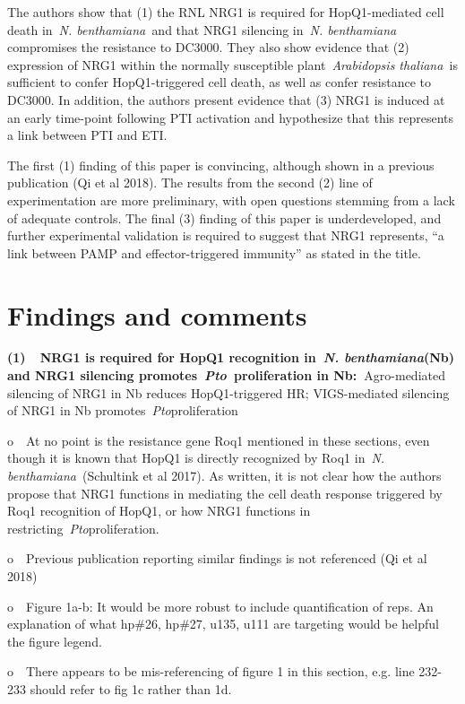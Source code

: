\documentclass[10pt]{article}
\begin{document}
The authors show that (1) the RNL NRG1 is required for HopQ1-mediated
cell death in~\emph{N. benthamiana~}and that NRG1 silencing in~\emph{N.
benthamiana} compromises the resistance to DC3000. They also show
evidence that (2) expression of NRG1 within the normally susceptible
plant~\emph{Arabidopsis thaliana~}is sufficient to confer
HopQ1-triggered cell death, as well as confer resistance to DC3000. In
addition, the authors present evidence that (3) NRG1 is induced at an
early time-point following PTI activation and hypothesize that this
represents a link between PTI and ETI.~

The first (1) finding of this paper is convincing, although shown in a
previous publication (Qi et al 2018). The results from the second (2)
line of experimentation are more preliminary, with open questions
stemming from a lack of adequate controls. The final (3) finding of this
paper is underdeveloped, and further experimental validation is required
to suggest that NRG1 represents, ``a link between PAMP and
effector-triggered immunity'' as stated in the title.~~

\section*{\(\)Findings and
comments}

{\label{457509}}\par\null

\textbf{(1)~~NRG1 is required for HopQ1 recognition in~\emph{N.
benthamiana}(Nb) and NRG1 silencing promotes~\emph{Pto~}proliferation in
Nb:~}Agro-mediated silencing of NRG1 in Nb reduces HopQ1-triggered HR;
VIGS-mediated silencing of NRG1 in Nb promotes~\emph{Pto}proliferation~

o~~At no point is the resistance gene Roq1 mentioned in these sections,
even though it is known that HopQ1 is directly recognized by Roq1
in~\emph{N. benthamiana~}(Schultink et al 2017). As written, it is not
clear how the authors propose that NRG1 functions in mediating the cell
death response triggered by Roq1 recognition of HopQ1, or how NRG1
functions in restricting~\emph{Pto}proliferation.~

o~~Previous publication reporting similar findings is not referenced (Qi
et al 2018)

o~~Figure 1a-b: It would be more robust to include quantification of
reps. An explanation of what hp\#26, hp\#27, u135, u111 are targeting
would be helpful the figure legend.~~

o~~There appears to be mis-referencing of figure 1 in this section, e.g.
line 232- 233 should refer to fig 1c rather than 1d.~
\end{document}

